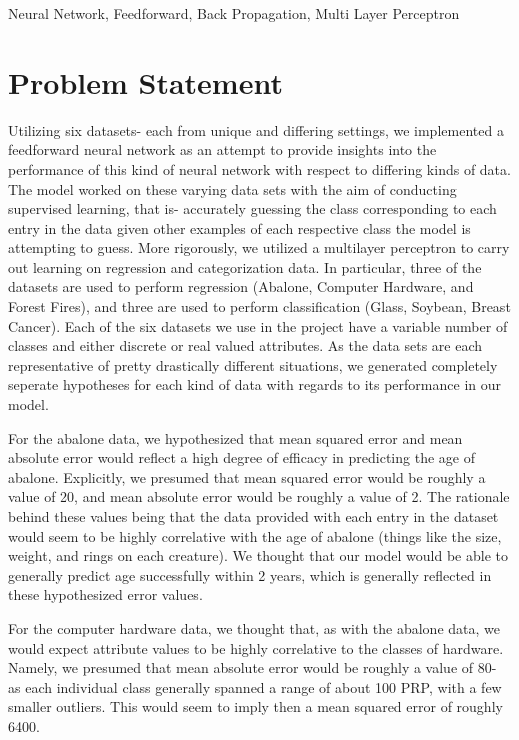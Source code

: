 \documentclass[twoside,11pt]{article}
\begin{document}
\begin{keywords}
	Neural Network, Feedforward, Back Propagation, Multi Layer Perceptron
\end{keywords}

\section{Problem Statement}
Utilizing six datasets- each from unique and differing settings, we implemented a feedforward neural network as an attempt to provide insights 
into the performance of this kind of neural network with respect to differing kinds of data. The model worked on these varying data sets with the aim
of conducting supervised learning, that is- accurately guessing the class corresponding to each entry in the data given other examples of each respective
class the model is attempting to guess. More rigorously, we utilized a multilayer perceptron 
to carry out learning on regression and categorization data. In particular, three of the datasets are used to perform regression 
(Abalone, Computer Hardware, and Forest Fires),
  and three are used to perform classification (Glass, Soybean, Breast Cancer). Each of the six datasets we use in the project have a variable 
  number of classes and either discrete or real valued attributes. As the data sets are each representative of pretty drastically different situations,
  we generated completely seperate hypotheses for each kind of data with regards to its performance in our model. 
  
  For the abalone data, we hypothesized that
  mean squared error and mean absolute error would reflect a high degree of efficacy in predicting the age of abalone. Explicitly, we presumed that mean squared 
  error would be roughly a value of 20, and mean absolute
  error would be roughly a value of 2. The rationale behind these values being that the data provided with each entry in the dataset would seem to be highly correlative
  with the age of abalone (things like the size, weight, and rings on each creature). We thought that our model would be able to generally predict age successfully within
  2 years, which is generally reflected in these hypothesized error values.
  
  For the computer hardware data, we thought that, as with the abalone data, we would expect attribute values to be highly correlative to the classes of hardware.
  Namely, we presumed that mean absolute error would be roughly a value of 80- as each individual class generally spanned a range of about 100 PRP, with a few 
  smaller outliers. This would seem to imply then a mean squared error of roughly 6400.
\end{document}
